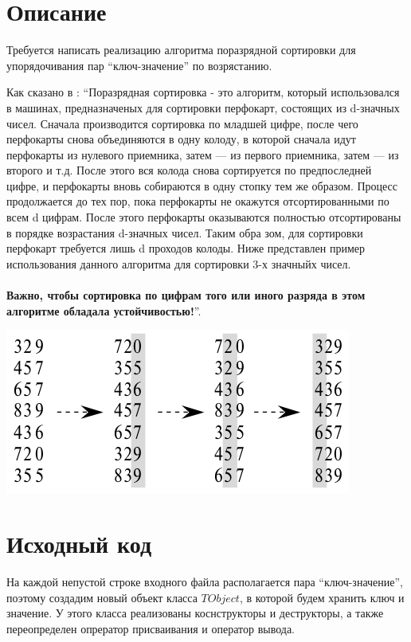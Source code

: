 \section{Описание}
Требуется написать реализацию алгоритма поразрядной сортировки для упорядочивания пар \enquote{ключ-значение} по возрястанию.

Как сказано в \cite{Kormen}: \enquote{Поразрядная сортировка - это алгоритм, который использовался в машинах, предназначеных для сортировки перфокарт,
состоящих из d-значных чисел. 
Сначала производится сортировка по младшей цифре, после чего перфокарты снова объединяются в одну колоду,
 в которой сначала идут перфокарты из нулевого приемника, затем — из
первого приемника, затем — из второго и т.д. После этого вся колода снова сортируется по предпоследней цифре,
 и перфокарты вновь собираются в одну стопку
тем же образом. Процесс продолжается до тех пор, пока перфокарты не окажутся отсортированными по всем d цифрам. 
После этого перфокарты оказываются
полностью отсортированы в порядке возрастания d-значных чисел. Таким обра
зом, для сортировки перфокарт требуется лишь d проходов колоды.
Ниже представлен пример использования данного алгоритма для сортировки 3-х значныйх чисел.\\
\\
\textbf{Важно, чтобы сортировка по цифрам того или иного разряда в этом алгоритме
обладала устойчивостью!}}.

\includegraphics{src/radix_sort_impl.png}

\pagebreak

\section{Исходный код}

На каждой непустой строке входного файла располагается пара \enquote{ключ-значение}, поэтому создадим новый 
объект класса $TObject$, в которой будем хранить ключ и значение. У этого класса реализованы коснструкторы и деструкторы, 
а также переопределен опрератор присваивания и оператор вывода.


